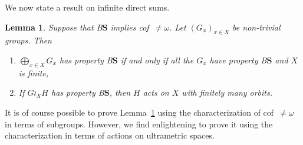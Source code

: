 \documentclass[a4paper]{article}
\newtheorem{lem}{Lemma}[section]
\theoremstyle{definition}
\newcommand*{\BS}{B$\mathbf{S}$}
\begin{document}
We now state a result on infinite direct sums.
%
%
\begin{lem}\label{Lemma:Cof}
Suppose that \BS{} implies cof~$\neq\omega$. %
Let $(G_x)_{x\in X}$ be non-trivial groups. Then
\begin{enumerate}
\item $\bigoplus_{x\in X}G_x$ has property \BS{} if and only if all the $G_x$ have property \BS{} and $X$ is finite,
\item If $G\wr_XH$ has property \BS, then $H$ acts on $X$ with finitely many orbits.
\end{enumerate}
\end{lem}
%
%
It is of course possible to prove Lemma~\ref{Lemma:Cof} using the characterization of cof~$\neq\omega$ in terms of subgroups. However, we find enlightening to prove it using the characterization in terms of actions on ultrametric spaces.
%
%
\end{document}
